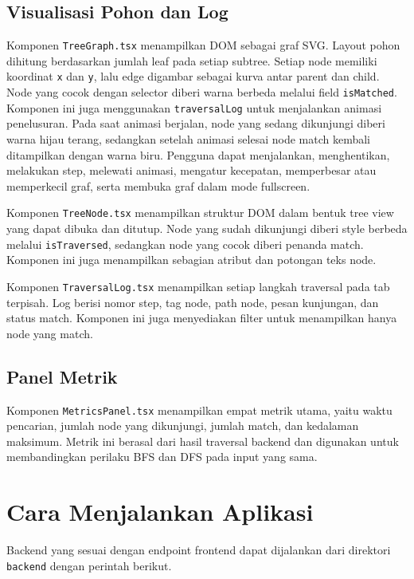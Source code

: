 \subsection{Visualisasi Pohon dan Log}

Komponen \texttt{TreeGraph.tsx} menampilkan DOM sebagai graf SVG. Layout pohon dihitung berdasarkan jumlah leaf pada setiap subtree. Setiap node memiliki koordinat \texttt{x} dan \texttt{y}, lalu edge digambar sebagai kurva antar parent dan child. Node yang cocok dengan selector diberi warna berbeda melalui field \texttt{isMatched}. Komponen ini juga menggunakan \texttt{traversalLog} untuk menjalankan animasi penelusuran. Pada saat animasi berjalan, node yang sedang dikunjungi diberi warna hijau terang, sedangkan setelah animasi selesai node match kembali ditampilkan dengan warna biru. Pengguna dapat menjalankan, menghentikan, melakukan step, melewati animasi, mengatur kecepatan, memperbesar atau memperkecil graf, serta membuka graf dalam mode fullscreen.

Komponen \texttt{TreeNode.tsx} menampilkan struktur DOM dalam bentuk tree view yang dapat dibuka dan ditutup. Node yang sudah dikunjungi diberi style berbeda melalui \texttt{isTraversed}, sedangkan node yang cocok diberi penanda match. Komponen ini juga menampilkan sebagian atribut dan potongan teks node.

Komponen \texttt{TraversalLog.tsx} menampilkan setiap langkah traversal pada tab terpisah. Log berisi nomor step, tag node, path node, pesan kunjungan, dan status match. Komponen ini juga menyediakan filter untuk menampilkan hanya node yang match.

\subsection{Panel Metrik}

Komponen \texttt{MetricsPanel.tsx} menampilkan empat metrik utama, yaitu waktu pencarian, jumlah node yang dikunjungi, jumlah match, dan kedalaman maksimum. Metrik ini berasal dari hasil traversal backend dan digunakan untuk membandingkan perilaku BFS dan DFS pada input yang sama.

\section{Cara Menjalankan Aplikasi}

Backend yang sesuai dengan endpoint frontend dapat dijalankan dari direktori \texttt{backend} dengan perintah berikut.

